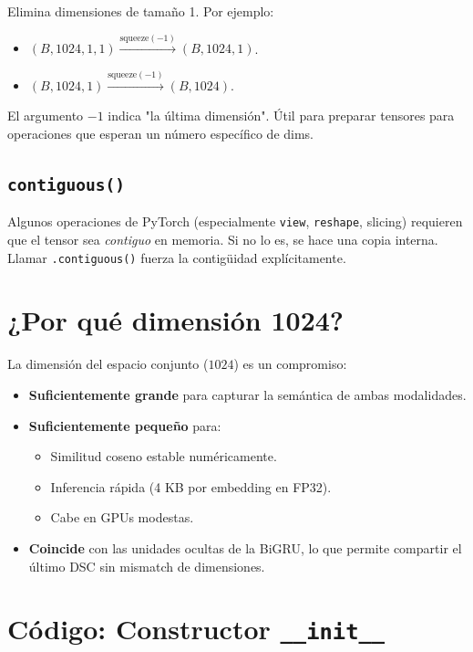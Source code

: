Elimina dimensiones de tamaño 1. Por ejemplo:
\begin{itemize}
  \item $(B, 1024, 1, 1) \xrightarrow{\text{squeeze}(-1)} (B,
        1024, 1)$.
  \item $(B, 1024, 1) \xrightarrow{\text{squeeze}(-1)} (B,
        1024)$.
\end{itemize}

\noindent El argumento $-1$ indica "la última dimensión". Útil
para preparar tensores para operaciones que esperan un número
específico de dims.

\subsection{\texttt{contiguous()}}

Algunos operaciones de PyTorch (especialmente \texttt{view},
\texttt{reshape}, slicing) requieren que el tensor sea
\emph{contiguo} en memoria. Si no lo es, se hace una copia
interna. Llamar \texttt{.contiguous()} fuerza la contigüidad
explícitamente.

\section{¿Por qué dimensión 1024?}

La dimensión del espacio conjunto ($1024$) es un compromiso:

\begin{itemize}
  \item \textbf{Suficientemente grande} para capturar la
        semántica de ambas modalidades.
  \item \textbf{Suficientemente pequeño} para:
        \begin{itemize}
          \item Similitud coseno estable numéricamente.
          \item Inferencia rápida (4 KB por embedding en FP32).
          \item Cabe en GPUs modestas.
        \end{itemize}
  \item \textbf{Coincide} con las unidades ocultas de la BiGRU,
        lo que permite compartir el último DSC sin mismatch de
        dimensiones.
\end{itemize}

\section{Código: Constructor \texttt{\_\_init\_\_}}

